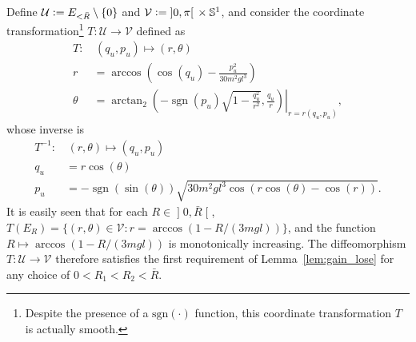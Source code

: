 \documentclass[journal,twoside,web, twocolumn,draftcls]{ieeecolor}
\DeclareMathOperator{\Sign}{sgn}
\newcommand*{\sign}[1]{\Sign\left(#1\right)}
\newcommand*{\Sone}{\mathbb{S}^1}
\newcommand*{\cU}{\mathcal{U}}
\newcommand*{\cV}{\mathcal{V}}
\newcommand*{\rone}{r}%
\newcommand*{\eqdef}{\vcentcolon=}
\begin{document}
Define $\cU \eqdef E_{<\bar R} \setminus \{0\}$ and $\cV \eqdef
\mathopen]0,\pi\mathclose[ \, \times \Sone$, and consider the coordinate
transformation\footnote{Despite the presence of a $\text{sgn}(\cdot)$ function,
this coordinate transformation $T$ is actually smooth.} $T: \cU \to \cV$
defined as
\begin{equation}\label{eq:T1}
\begin{aligned}
T: & \, (q_u,p_u) \mapsto (r,\theta)  \\
%
r &= \arccos\left(\cos(q_u) - \frac{p_u^2}{30m^2gl^3}\right) \\
%
\theta &=\left.\arctan_2\left(-\sign{p_u}\sqrt{1-\frac{q_u^2}{r^2}},\frac{q_u}{r}\right)
    \right|_{r = \rone(q_u,p_u)},
\end{aligned}
\end{equation}
whose inverse is
\[
\begin{aligned}
T^{-1}: & \, (r,\theta) \mapsto (q_u,p_u)\\
%
q_u &= r \cos(\theta) \\
% 
p_u &=-\sign{\sin(\theta)} 
        \sqrt{30m^2gl^3\cos(r\cos(\theta) - \cos(r))}.
\end{aligned}
\]
It is easily seen that for each $R \in \mathopen ]0,\bar R\mathclose[$, 
$T(E_R) = \{(r,\theta)\in \cV : r = \arccos(1 - R/(3 m g l))\}$, and the function
$R \mapsto \arccos(1 - R/(3 m g l))$ is monotonically increasing. The
diffeomorphism
$T: \cU \to \cV$ therefore satisfies the first requirement of
Lemma~\ref{lem:gain_lose} for any choice of $0< R_1 < R_2 < \bar R$. 
\end{document}
